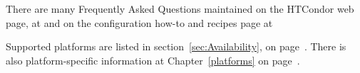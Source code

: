 

There are many Frequently Asked Questions maintained
on the HTCondor web page, at
and on the configuration how-to and recipes page
at

Supported platforms are listed in section~\ref{sec:Availability}, on
page~\pageref{sec:Availability}.
There is also platform-specific information at
Chapter~\ref{platforms} on page~\pageref{platforms}.

%
%
%
%
%
%
%
%
%

